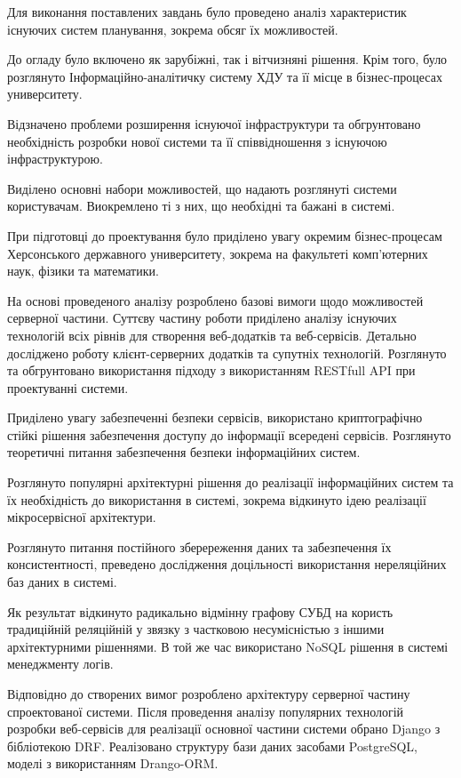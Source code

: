 
Для виконання поставлених завдань було проведено аналіз характеристик існуючих систем планування, зокрема обсяг їх можливостей.

До огладу було включено як зарубіжні, так і вітчизняні рішення. Крім того, було розглянуто Інформаційно-аналітичку систему ХДУ та її місце в бізнес-процесах университету. 

Відзначено проблеми розширення існуючої інфраструктури та обгрунтовано необхідність розробки нової системи та її співвідношення з існуючою інфраструктурою.

Виділено основні набори можливостей, що надають розглянуті системи користувачам. Виокремлено ті з них, що необхідні та бажані в системі.

При підготовці до проектування було приділено увагу окремим бізнес-процесам Херсонського державного университету, зокрема на факультеті комп’ютерних наук, фізики та математики.

На основі проведеного аналізу розроблено базові вимоги щодо можливостей серверної частини. Суттєву частину роботи приділено аналізу існуючих технологій всіх рівнів для створення веб-додатків та веб-сервісів. Детально досліджено роботу клієнт-серверних додатків та супутніх технологій. Розглянуто та обгрунтовано використання підходу з використанням RESTfull API при проектуванні системи.

Приділено увагу забезпеченні безпеки сервісів, використано криптографічно стійкі рішення забезпечення доступу до інформації всередені сервісів. Розглянуто теоретичні питання забезпечення безпеки інформаційних систем.

Розглянуто популярні архітектурні рішення до реалізації інформаційних систем та їх необхідність до використання в системі, зокрема відкинуто ідею реалізації мікросервісної архітектури.

Розглянуто питання постійного зберереження даних та забезпечення їх консистентності, преведено дослідження доцільності використання нереляційних баз даних в системі. 

Як результат відкинуто радикально відмінну графову СУБД на користь традиційній реляційній у звязку з частковою несумісністью з іншими архітектурними рішеннями. В той же час використано NoSQL рішення в системі менеджменту логів.

Відповідно до створених вимог розроблено архітектуру серверної частину спроектованої системи. Після проведення аналізу популярних технологій розробки веб-сервісів для реалізації основної частини системи обрано Django з бібліотекою DRF. Реалізовано структуру бази даних засобами PostgreSQL, моделі з використанням Drango-ORM.

